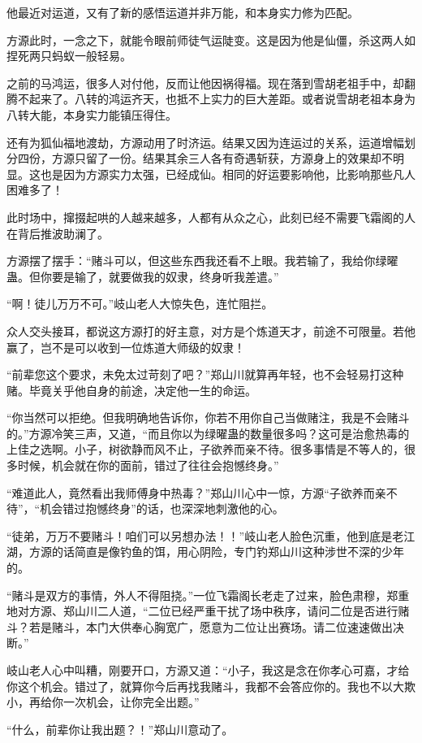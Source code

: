 \begin{this_body}
他最近对运道，又有了新的感悟运道并非万能，和本身实力修为匹配。

方源此时，一念之下，就能令眼前师徒气运陡变。这是因为他是仙僵，杀这两人如捏死两只蚂蚁一般轻易。

之前的马鸿运，很多人对付他，反而让他因祸得福。现在落到雪胡老祖手中，却翻腾不起来了。八转的鸿运齐天，也抵不上实力的巨大差距。或者说雪胡老祖本身为八转大能，本身实力能镇压得住。

还有为狐仙福地渡劫，方源动用了时济运。结果又因为连运过的关系，运道增幅划分四份，方源只留了一份。结果其余三人各有奇遇斩获，方源身上的效果却不明显。这也是因为方源实力太强，已经成仙。相同的好运要影响他，比影响那些凡人困难多了！

此时场中，撺掇起哄的人越来越多，人都有从众之心，此刻已经不需要飞霜阁的人在背后推波助澜了。

方源摆了摆手：“赌斗可以，但这些东西我还看不上眼。我若输了，我给你绿曜蛊。但你要是输了，就要做我的奴隶，终身听我差遣。”

“啊！徒儿万万不可。”岐山老人大惊失色，连忙阻拦。

众人交头接耳，都说这方源打的好主意，对方是个炼道天才，前途不可限量。若他赢了，岂不是可以收到一位炼道大师级的奴隶！

“前辈您这个要求，未免太过苛刻了吧？”郑山川就算再年轻，也不会轻易打这种赌。毕竟关乎他自身的前途，决定他一生的命运。

“你当然可以拒绝。但我明确地告诉你，你若不用你自己当做赌注，我是不会赌斗的。”方源冷笑三声，又道，“而且你以为绿曜蛊的数量很多吗？这可是治愈热毒的上佳之选啊。小子，树欲静而风不止，子欲养而亲不待。很多事情是不等人的，很多时候，机会就在你的面前，错过了往往会抱憾终身。”

“难道此人，竟然看出我师傅身中热毒？”郑山川心中一惊，方源“子欲养而亲不待”，“机会错过抱憾终身”的话，也深深地刺激他的心。

“徒弟，万万不要赌斗！咱们可以另想办法！！”岐山老人脸色沉重，他到底是老江湖，方源的话简直是像钓鱼的饵，用心阴险，专门钓郑山川这种涉世不深的少年的。

“赌斗是双方的事情，外人不得阻挠。”一位飞霜阁长老走了过来，脸色肃穆，郑重地对方源、郑山川二人道，“二位已经严重干扰了场中秩序，请问二位是否进行赌斗？若是赌斗，本门大供奉心胸宽广，愿意为二位让出赛场。请二位速速做出决断。”

岐山老人心中叫糟，刚要开口，方源又道：“小子，我这是念在你孝心可嘉，才给你这个机会。错过了，就算你今后再找我赌斗，我都不会答应你的。我也不以大欺小，再给你一次机会，让你完全出题。”

“什么，前辈你让我出题？！”郑山川意动了。


\end{this_body}
